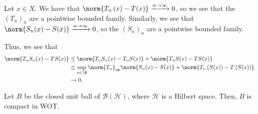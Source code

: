 \documentclass[10pt]{mypackage}
\begin{document}
\begin{solution}
  Let $x\in X$. We have that $\norm{T_n\left(x\right)-T(x)}\xrightarrow{n\rightarrow\infty}0$, so we see that the $\left(T_n\right)_n$ are a pointwise bounded family. Similarly, we see that $\norm{S_n(x) - S(x)}\xrightarrow{n\rightarrow\infty}0$, so the $\left(S_n\right)_n$ are a pointwise bounded family.\newline

  Thus, we see that
  \begin{align*}
    \norm{T_nS_n(x) - TS(x)} &\leq \norm{T_nS_n(x) - T_nS(x)} + \norm{T_nS(x) - TS(x)}\\
                             &\leq \sup_{n\in \N}\norm{T_n}_{\text{op}}\norm{S_n(x) - S(x)} + \norm{T_n\left(S(x)\right) - T\left(S(x)\right)}\\
                             &\rightarrow 0.
  \end{align*}
  
\end{solution}
\begin{theorem}
  Let $B$ be the closed unit ball of $\mathcal{B}\left(\mathcal{H}\right)$, where $\mathcal{H}$ is a Hilbert space. Then, $B$ is compact in WOT.
\end{theorem}
\end{document}
